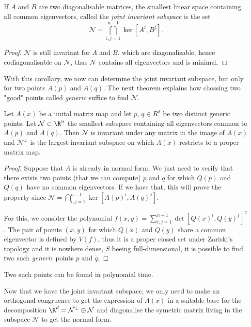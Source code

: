 \documentclass[english, mathematiques, theoremes, diagrammes, dessin, a4paper, margin = 2cm]{article-perso}
\begin{document}
\begin{corollary}
	If $A$ and $B$ are two diagonalisable matrices, the smallest linear space containing all common eigenvectors, called the \emph{joint invariant subspace} is the set
	\[\mathcal{N} = \bigcap_{i,j = 1}^{n-1} \ker [A^i, B^j].\]
\end{corollary}
\begin{proof}
	$\mathcal{N}$ is still invariant for $A$ and $B$, which are diagonalisable, hence codiagonalisable on $\mathcal{N}$, thus $\mathcal{N}$ contains all eigenvectors and is minimal.
\end{proof}
With this corollary, we now can determine the joint invariant subspace, but only for two points $A(p)$ and $A(q)$. The next theorem explains how chossing two "good" points called \emph{generic} suffice to find $\mathcal{N}$.
\begin{theorem}
	Let $A(x)$ be a unital matrix map and let $p,\, q \in R^d$ be two distinct generic points. Let $\mathcal{N} \subset \R^n$ the smallest subspace containing all eigenvectors common to $A(p)$ and $A(q)$. Then $\mathcal{N}$ is invariant under any matrix in the image of $A(x)$ and $\mathcal{N}^\bot$ is the largest invariant subspace on which $A(x)$ restricts to a proper matrix map.
\end{theorem}

\begin{proof}
	Suppose that $A$ is already in normal form. We just need to verify that there exists two points (that we can compute) $p$ and $q$ for which $Q(p)$ and $Q(q)$ have no common eigenvectors. If we have that, this will prove the property since $\mathcal{N} = \bigcap_{i,j = 1}^{n-1} \ker [A(p)^i, A(q)^j]$.

	For this, we consider the polynomial $f(x,y) = \sum\limits_{i,j = 1}^{n-1} \det [Q(x)^i, Q(y)^j]^2 $. The pair of points $(x,y)$ for which $Q(x)$ and $Q(y)$ share a common eigenvector is defined by $V(f)$, thus it is a proper closed set under Zariski's topology and it is nowhere dense, $S$ beeing full-dimensional, it is possible to find two such \emph{generic} points $p$ and $q$.
\end{proof}
Two such points can be found in polynomial time.

Now that we have the joint invariant subspace, we only need to make an orthogonal congruence to get the expression of $A(x)$ in a suitable base for the decomposition $\R^d = \mathcal{N}^\bot \oplus \mathcal{N}$ and diagonalise the symetric matrix living in the subspace $\mathcal{N}$ to get the normal form.
\end{document}
